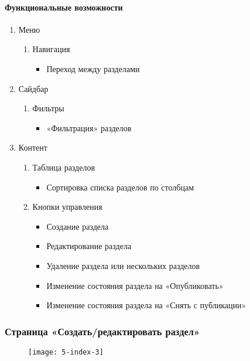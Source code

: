 \paragraph{Функциональные возможности}
\begin{enumerate}
	\item Меню
	\begin{enumerate}
		\item Навигация
		\begin{itemize}
			\item Переход между разделами
		\end{itemize}
	\end{enumerate}

	\item Сайдбар
	\begin{enumerate}
		\item Фильтры
		\begin{itemize}
			\item «Фильтрация» разделов
		\end{itemize}
	\end{enumerate}

	\item Контент
	\begin{enumerate}
		\item Таблица разделов
		\begin{itemize}
			\item Сортировка списка разделов по столбцам
		\end{itemize}

		\item Кнопки управления
		\begin{itemize}
			\item Создание раздела
			\item Редактирование раздела
			\item Удаление раздела или нескольких разделов
			\item Изменение состояния раздела на «Опубликовать»
			\item Изменение состояния раздела на «Снять с публикации»
		\end{itemize}
	\end{enumerate}
\end{enumerate}

\subsubsection{Страница «Создать/редактировать раздел»}
\begin{figure}[H]
\texttt{[image: 5-index-3]}
\end{figure}
